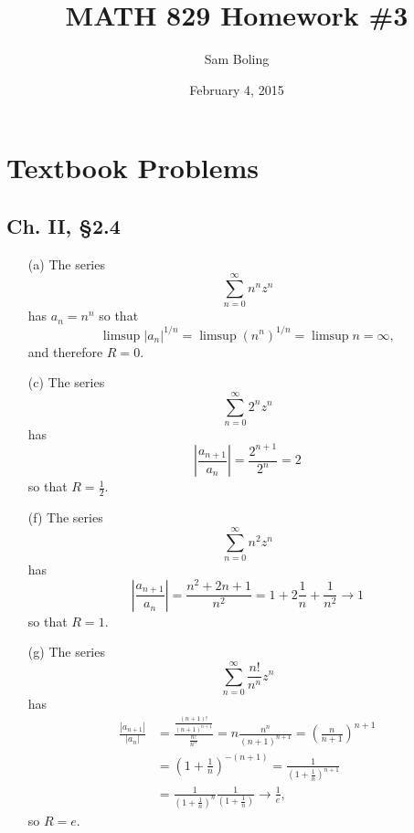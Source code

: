 \documentclass{article}
\title{MATH 829 Homework \#3}
\date{February 4, 2015}
\author{Sam Boling}
\newcounter{Problem}
\begin{document}
\begin{titlepage}
\maketitle
\end{titlepage}

\section{Textbook Problems}

\subsection*{Ch. II, \S 2.4}
\begin{itemize}
  \item[(a)]{
    The series
    $$
    \sum_{n=0}^\infty n^n z^n
    $$
    has $a_n = n^n$ so that
    $$
      \limsup |a_n|^{1 / n}
    = \limsup (n^n)^{1 / n}
    = \limsup n = \infty,
    $$
    and therefore $R = 0$.
  }
  \item[(c)]{
    The series
    $$
    \sum_{n=0}^\infty 2^n z^n
    $$
    has
    $$
      \left|\frac{a_{n+1}}{a_n}\right|
    = \frac{2^{n+1}}{2^n}
    = 2
    $$
    so that $R = \frac{1}{2}$.
  }
  \item[(f)]{
    The series
    $$
    \sum_{n=0}^\infty n^2 z^n
    $$
    has
    $$
      \left|\frac{a_{n+1}}{a_n}\right|
    = \frac{n^2 + 2n + 1}{n^2}
    = 1 + 2\frac{1}{n} + \frac{1}{n^2} \to 1
    $$
    so that $R = 1$.
  }
  \item[(g)]{
    The series
    $$
    \sum_{n=0}^\infty \frac{n!}{n^n} z^n
    $$
    has
    \begin{align*}
      \frac{|a_{n+1}|}{|a_n|}
    &= \frac{\frac{(n+1)!}{(n+1)^{n+1}}}
            {\frac{n!}{n^n}}
     = n\frac{n^n}{(n+1)^{n+1}}
     = \left(\frac{n}{n+1}\right)^{n+1} \\
    &= \left(1 + \frac{1}{n}\right)^{-(n+1)}
     = \frac{1}{\left(1 + \frac{1}{n}\right)^{n+1}} \\
    &= \frac{1}{\left(1 + \frac{1}{n}\right)^n}
       \frac{1}{\left(1 + \frac{1}{n}\right)}
     \to \frac{1}{e},
    \end{align*}
    so $R = e$.
  }
\end{itemize}
\end{document}
